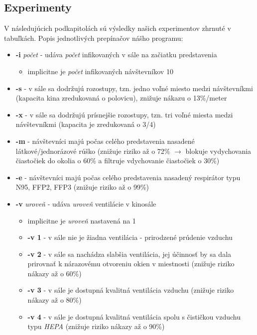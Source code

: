 \documentclass[a4paper, 11pt]{article}
\begin{document}
        \subsection{Experimenty}
        V následujúcich podkapitolách sú výsledky našich experimentov zhrnuté v tabuľkách. Popis jednotlivých prepínačov nášho programu:
        \begin{itemize}
            \item \textbf{-i} \textit{počet} - udáva \textit{počet} infikovaných v sále na začiatku predstavenia
                \begin{itemize}
                    \item implicitne je \textit{počet} infikovaných návštevníkov 10
                \end{itemize}
            \item \textbf{-s} - v sále sa dodržujú rozostupy, tzn. jedno voľné miesto medzi návštevníkmi (kapacita kina zredukovaná o polovicu), znižuje nákazu o 13\%/meter
            \item \textbf{-x} - v sále sa dodržujú prísnejšie rozostupy, tzn. tri voľné miesta medzi návštevníkmi (kapacita je zredukovaná o 3/4)
            \item \textbf{-m} - návštevníci majú počas celého predstavenia nasadené látkové/jednorázové rúško (znižuje riziko až o 72\% $\rightarrow$ blokuje vydychovania čiastočiek do okolia o 60\% a filtruje vdychovanie čiastočiek o 30\%)
            \item \textbf{-e} - návštevníci majú počas celého predstavenia nasadený respirátor typu N95, FFP2, FFP3 (znižuje riziko až o 99\%) 
            \item \textbf{-v} \textit{uroveň} - udáva \textit{uroveň} ventilácie v kinosále
                \begin{itemize}
                    \item implicitne je \textit{uroveň} nastavená na 1
                    \item \textbf{-v 1} - v sále nie je žiadna ventilácia - prirodzené prúdenie vzduchu
                    \item \textbf{-v 2} - v sále sa nachádza slabšia ventilácia, jej  účinnosť by sa dala prirovnať k nárazovému otvoreniu okien v miestnosti (znižuje riziko nákazy až o 60\%)
                    \item \textbf{-v 3} - v sále je dostupná kvalitná ventilácia vzduchu (znižuje riziko nákazy až o 80\%)
                    \item \textbf{-v 4} - v sále je dostupná kvalitná ventilácia spolu s čističkou vzduchu typu \emph{HEPA} (znižuje riziko nákazy až o 90\%) \cite{joslelieveldfrankhelleiset.al.2020}
                \end{itemize}
        \end{itemize}
        
\end{document}
